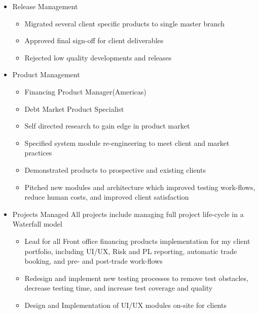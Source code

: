 \documentclass[11pt,letterpaper,roman]{moderncv}
\begin{document}
\begin{itemize}
    \item{Release Management}
        \begin{itemize}
            \item Migrated several client specific products to single master branch
            \item Approved final sign-off for client deliverables
            \item Rejected low quality developments and releases
        \end{itemize}

    \item{Product Management}
        \begin{itemize}
            \item Financing Product Manager(Americas)
            \item Debt Market Product Specialist 
            \item Self directed research to gain edge in product market
            \item Specified system module re-engineering to meet client and market practices
            \item Demonstrated products to prospective and existing clients
            \item Pitched new modules and architecture which improved testing work-flows, reduce human costs, and improved client satisfaction
        \end{itemize}

    \item{Projects Managed}
        All projects include managing full project life-cycle in a Waterfall model
        \begin{itemize}
            \item Lead for all Front office financing products implementation for my client portfolio, including UI/UX, Risk and PL reporting, automatic trade booking, and pre- and post-trade work-flows
            \item Redesign and implement new testing processes to remove test obstacles, decrease testing time, and increase test coverage and quality
            \item Design and Implementation of UI/UX modules on-site for clients
        \end{itemize}


\end{itemize}
\end{document}
